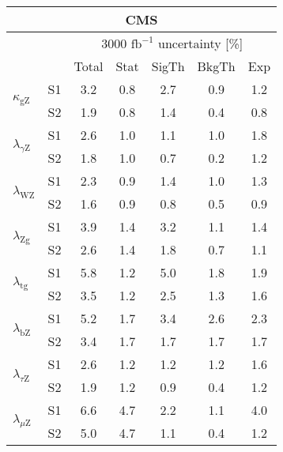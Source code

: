 \begin{tabular}{@{} l c c@{\hskip 0.15in} c c c c @{}}
 \hline
   \multicolumn{7}{c}{CMS}\\
 \hline
  &  & \multicolumn{5}{c}{3000 $\text{fb}^{-1}$ uncertainty [\%]} \\
  &  & Total & Stat & SigTh & BkgTh & Exp \\
 \hline
\multirow{2}{*}{$\kappa_{\mathrm{gZ}}$} & S1  & 3.2& 0.8 & 2.7 & 0.9 & 1.2  \\[1pt]
                        & S2  & 1.9& 0.8 & 1.4 & 0.4 & 0.8  \\[4pt]
\multirow{2}{*}{$\lambda_{\gamma\mathrm{Z}}$} & S1  & 2.6& 1.0 & 1.1 & 1.0 & 1.8  \\[1pt]
                        & S2  & 1.8& 1.0 & 0.7 & 0.2 & 1.2  \\[4pt]
\multirow{2}{*}{$\lambda_{\mathrm{WZ}}$} & S1  & 2.3& 0.9 & 1.4 & 1.0 & 1.3  \\[1pt]
                        & S2  & 1.6& 0.9 & 0.8 & 0.5 & 0.9  \\[4pt]
\multirow{2}{*}{$\lambda_{\mathrm{Zg}}$} & S1  & 3.9& 1.4 & 3.2 & 1.1 & 1.4  \\[1pt]
                        & S2  & 2.6& 1.4 & 1.8 & 0.7 & 1.1  \\[4pt]
\multirow{2}{*}{$\lambda_{\mathrm{tg}}$} & S1  & 5.8& 1.2 & 5.0 & 1.8 & 1.9  \\[1pt]
                        & S2  & 3.5& 1.2 & 2.5 & 1.3 & 1.6  \\[4pt]
\multirow{2}{*}{$\lambda_{\mathrm{bZ}}$} & S1  & 5.2& 1.7 & 3.4 & 2.6 & 2.3  \\[1pt]
                        & S2  & 3.4& 1.7 & 1.7 & 1.7 & 1.7  \\[4pt]
\multirow{2}{*}{$\lambda_{\tau\mathrm{Z}}$} & S1  & 2.6& 1.2 & 1.2 & 1.2 & 1.6  \\[1pt]
                        & S2  & 1.9& 1.2 & 0.9 & 0.4 & 1.2  \\[4pt]
\multirow{2}{*}{$\lambda_{\mu\mathrm{Z}}$} & S1  & 6.6& 4.7 & 2.2 & 1.1 & 4.0  \\[1pt]
                        & S2  & 5.0& 4.7 & 1.1 & 0.4 & 1.2  \\[4pt]
\hline
\end{tabular}